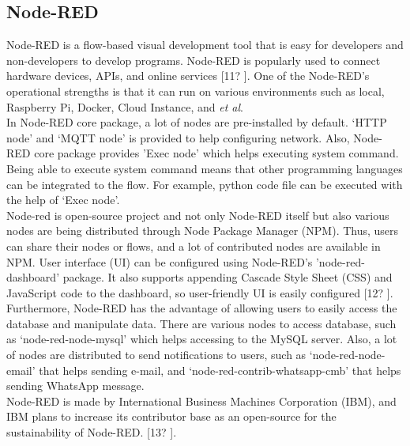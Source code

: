 \documentclass[conference]{IEEEtran}
\begin{document}
\subsection{Node-RED}
Node-RED is a flow-based visual development tool that is easy for developers and non-developers to develop programs. Node-RED is popularly used to connect hardware devices, APIs, and online services [11?
].
One of the Node-RED’s operational strengths is that it can run on various environments such as local, Raspberry Pi, Docker, Cloud Instance, and \textit{et al}. \\
\indent In Node-RED core package, a lot of nodes are pre-installed by default. ‘HTTP node’ and ‘MQTT node’ is provided to help configuring network. Also, Node-RED core package provides ’Exec node’ which helps executing system command. Being able to execute system command means that other programming languages can be integrated to the flow. For example, python code file can be executed with the help of ‘Exec node’. \\
\indent Node-red is open-source project and not only Node-RED itself but also various nodes are being distributed through Node Package Manager (NPM). Thus, users can share their nodes or flows, and a lot of contributed nodes are available in NPM.
User interface (UI) can be configured using Node-RED’s ’node-red-dashboard’ package. It also supports appending Cascade Style Sheet (CSS) and JavaScript code to the dashboard, so user-friendly UI is easily configured [12?
]. Furthermore, Node-RED has the advantage of allowing users to easily access the database and manipulate data. There are various nodes to access database, such as ‘node-red-node-mysql’ which helps accessing to the MySQL server. Also, a lot of nodes are distributed to send notifications to users, such as ‘node-red-node-email’ that helps sending e-mail, and ‘node-red-contrib-whatsapp-cmb’ that helps sending WhatsApp message. \\
\indent Node-RED is made by International Business Machines Corporation (IBM), and IBM plans to increase its contributor base as an open-source for the sustainability of Node-RED. [13?
].
\end{document}

